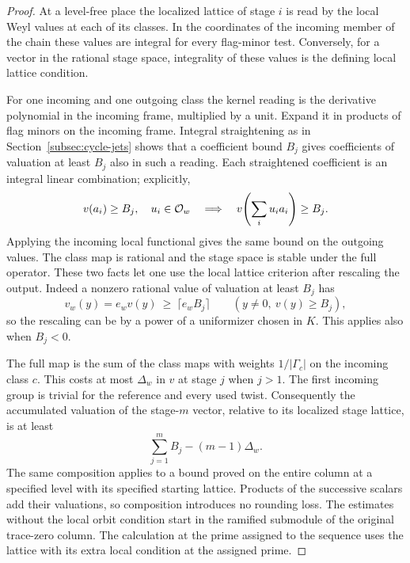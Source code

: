 \begin{proof}
At a level-free place the localized lattice of stage \(i\)
is read by the local Weyl values at each of its classes.
In the coordinates of the incoming member of the chain these
values are integral for every flag-minor test. Conversely,
for a vector in the rational stage space, integrality of
these values is the defining local lattice condition.

For
one incoming and one outgoing class the kernel reading is
the derivative polynomial in the incoming frame, multiplied
by a unit. Expand it in products of flag minors on the
incoming frame. Integral straightening as in
Section~\ref{subsec:cycle-jets} shows that a coefficient
bound \(B_j\) gives coefficients of valuation at least \(B_j\)
also in such a reading.
Each straightened coefficient is an integral linear combination; explicitly,
\[
  v(a_i)\ge B_j,\quad u_i\in{\cal O}_w\quad\Longrightarrow\quad v\!\left(\sum_i u_i a_i\right)\ge B_j .
\]
 Applying the incoming local
functional gives the same bound on the outgoing values.
The class map is rational and the stage space is stable
under the full operator. These two facts let one use the
local lattice criterion after rescaling the output. Indeed
a nonzero rational value of valuation at least \(B_j\)
has 
\[
  v_w(y)=e_w v(y)\ \ge\ \lceil e_w B_j\rceil\qquad(y\ne0,\ v(y)\ge B_j),
\]
 so the rescaling can be
by a power of a uniformizer chosen in \(K\). This applies
also when \(B_j<0\).

The full map is the sum of the class maps with weights
\(1/|\Gamma_c|\) on the incoming class \(c\). This costs
at most \(\Delta_w\) in \(v\) at stage \(j\) when \(j>1\).
The first incoming group is trivial for the reference
and every used twist. Consequently the accumulated
valuation of the stage-\(m\) vector, relative to its
localized stage lattice, is at least
\[
           \sum_{j=1}^m B_j-(m-1)\Delta_w .
\]
The same composition applies to a bound proved on
the entire column at a specified level with its specified
starting lattice. Products of the successive scalars add
their valuations, so composition introduces no rounding
loss. The estimates without the local orbit condition start in the ramified
submodule of the original trace-zero column. The
calculation at the prime assigned to the sequence uses the lattice with its extra
local condition at the assigned prime.


\end{proof}
